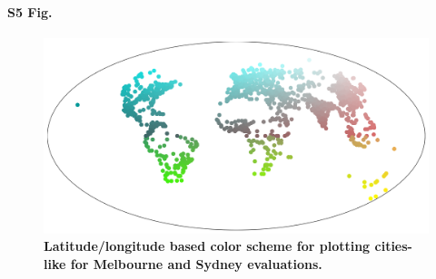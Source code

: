 \documentclass[10pt,letterpaper,hidelinks]{article}
\begin{document}
\paragraph*{S5 Fig.}
\begin{figure}[!htbp]
\centering    
\includegraphics[scale=0.25]{Images/PlosOne/Fig5.png} 
\caption{\bf Latitude/longitude based color scheme for plotting cities-like for Melbourne and Sydney evaluations.}    
 \label{fig:colorscheme}  
\end{figure} 
\end{document}
